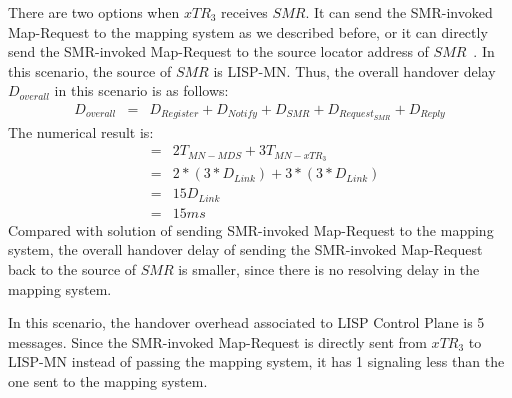 There are two options when $xTR_3$ receives $SMR$. It can send the SMR-invoked Map-Request to the mapping system as we described before, or it can directly send the SMR-invoked Map-Request to the source locator address of $SMR$~\cite{rfc6830}. In this scenario, the source of $SMR$ is LISP-MN. Thus, the overall handover delay $D_{overall}$ in this scenario is as follows:
\begin{eqnarray}
D_{overall} &=& D_{Register} + D_{Notify} + D_{SMR} + D_{Request_{SMR}} + D_{Reply} 
\end{eqnarray}
The numerical result is:
\begin{eqnarray}
&=& 2T_{MN-MDS} + 3T_{MN-xTR_3}  \nonumber \\
&=& 2* (3*D_{Link}) + 3*(3*D_{Link}) \nonumber \\
&=& 15D_{Link} \nonumber \\
&=& 15 ms \nonumber
\end{eqnarray}
Compared with solution of sending SMR-invoked Map-Request to the mapping system, the overall handover delay of sending the SMR-invoked Map-Request back to the source of $SMR$ is smaller, since there is no resolving delay in the mapping system. %

In this scenario, the handover overhead associated to LISP Control Plane is 5 messages. Since the SMR-invoked Map-Request is directly sent from $xTR_3$ to LISP-MN instead of passing the mapping system, it has 1 signaling less than the one sent to the mapping system.

